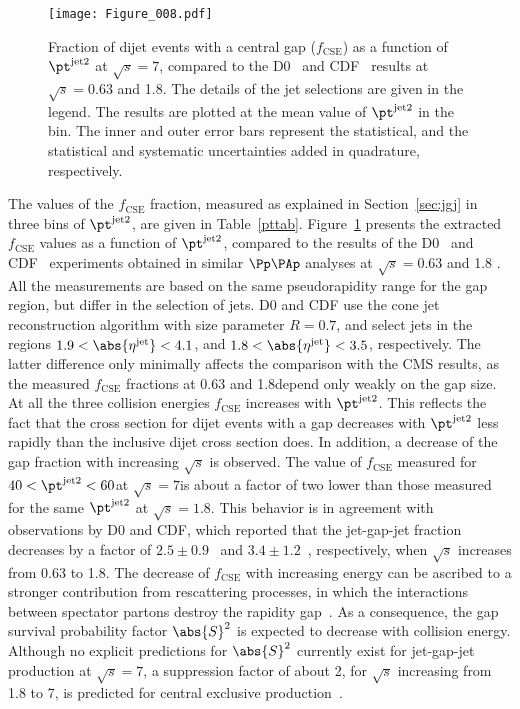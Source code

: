 \documentclass[11pt,twoside,a4paper,cmspaper,final,collab]{cms-tdr}
\begin{document}
\begin{figure} \centering
\texttt{[image: Figure\_008.pdf]}
\caption{Fraction of dijet events with a central gap ($f_\mathrm{CSE}$) as a function of $\pt^\text{jet2}$ at $\sqrt{s}=7$\TeV, compared to the D0~\cite{d03} and CDF~\cite{cdf2,cdf3} results at $\sqrt{s}=0.63$ and 1.8\TeV. The details of the jet selections are given in the legend. The results are plotted at the mean value of $\pt^\text{jet2}$ in the bin. The inner and outer error bars represent the statistical, and the statistical and systematic uncertainties added in quadrature, respectively.}
\label{d0cms}
\end{figure}

The values of the $f_\mathrm{CSE}$ fraction, measured as explained in Section~\ref{sec:jgj} in three bins of $\pt^\text{jet2}$, are given in Table~\ref{pttab}.  Figure~\ref{d0cms} presents the extracted $f_\mathrm{CSE}$ values as a function of $\pt^\text{jet2}$, compared to the results of the D0~\cite{d03} and CDF~\cite{cdf2,cdf3} experiments obtained in similar $\Pp\PAp$ analyses at $\sqrt{s}=0.63$ and 1.8 \TeV. All the measurements are based on the same
pseudorapidity range for the gap region, but differ in the selection of jets. D0 and CDF use the cone jet reconstruction algorithm with size parameter $R = 0.7$, and select jets in the regions $1.9<\abs{\eta^{\text{jet}}}<4.1$, and $1.8<\abs{\eta^{\text{jet}}}<3.5$, respectively. The latter difference only minimally affects the comparison with the CMS results, as the measured $f_\mathrm{CSE}$ fractions at 0.63 and 1.8\TeV depend only weakly on the gap size. At all the three collision energies $f_\mathrm{CSE}$ increases with $\pt^\text{jet2}$. This reflects the fact that the cross section for dijet events with a gap decreases with $\pt^\text{jet2}$ less rapidly than the inclusive dijet cross section does. In addition, a decrease of the gap fraction with increasing $\sqrt{s}$ is observed. The value of $f_\mathrm{CSE}$ measured for $40<\pt^\text{jet2}<60$\GeV at $\sqrt{s}=7$\TeV is about a factor of two lower than those measured for the same $\pt^\text{jet2}$ at $\sqrt{s}=1.8$\TeV. This behavior is in agreement with observations by D0 and CDF, which reported that the jet-gap-jet fraction decreases by a factor of $2.5 \pm 0.9$~\cite{d03} and $3.4 \pm 1.2$~\cite{cdf3}, respectively, when $\sqrt{s}$ increases from 0.63 to 1.8\TeV. The decrease of $f_\mathrm{CSE}$ with increasing energy can be ascribed to a stronger contribution from rescattering processes, in which the interactions between spectator partons destroy the rapidity gap~\cite{bj,glm}. As a consequence, the gap survival probability factor $\abs{S}^2$ is expected to decrease with collision energy. Although no explicit predictions for $\abs{S}^2$ currently exist for jet-gap-jet production at $\sqrt{s}=7$\TeV, a suppression factor of about 2, for $\sqrt{s}$ increasing from 1.8 to 7\TeV, is predicted for central exclusive production~\cite{Khoze:2013dha,Gotsman:2015aga}.
\end{document}
